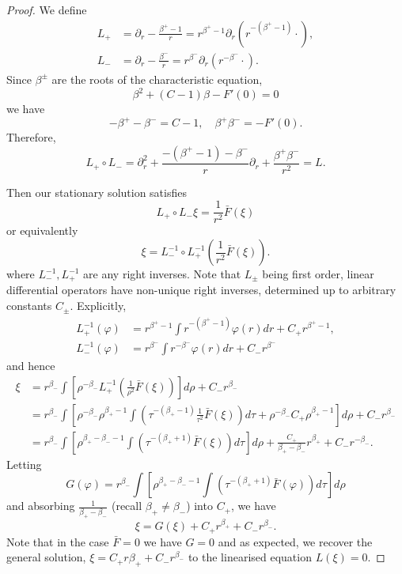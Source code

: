 \documentclass{amsart}
\begin{document}
\begin{proof}
We define
\begin{align*}
L_+ &= \partial_r - \frac{\beta^+ - 1}{r} = r^{\beta^+ - 1} \partial_r (r^{-(\beta^+ - 1)} \cdot) , \\
L_- &= \partial_r - \frac{\beta^-}{r} = r^{\beta^-} \partial_r (r^{-\beta^-} \cdot).
\end{align*}
Since \(\beta^{\pm}\) are the roots of the characteristic equation,
\[
\beta^2 + (C - 1) \beta - F'(0) = 0
\]
we have
\[
- \beta^+ - \beta^- = C-1, \quad \beta^+ \beta^- = -F'(0).
\]
Therefore,
\[
L_+ \circ L_- = \partial_r^2 + \frac{-(\beta^+ - 1) -\beta^-}{r} {\partial_r} + \frac{\beta^+ \beta^-}{r^2} = L.
\]

Then our stationary solution satisfies
\[
L_+ \circ L_- \xi = \frac{1}{r^2} \bar{F}(\xi)
\]
or equivalently
\[
\xi = L_-^{-1} \circ L_+^{-1} \left(\frac{1}{r^2} \bar{F}(\xi)\right).
\]
where \(L_-^{-1}, L_+^{-1}\) are any right inverses. Note that \(L_{\pm}\) being first order, linear differential operators have non-unique right inverses, determined up to arbitrary constants \(C_{\pm}\). Explicitly,
\begin{align*}
L_+^{-1} (\varphi) &= r^{\beta^+ - 1} \int r^{-(\beta^+ - 1)} \varphi(r) dr + C_+ r^{\beta^+-1}, \\
L_-^{-1} (\varphi) &= r^{\beta^-} \int r^{-\beta^-} \varphi(r) dr + C_- r^{\beta^-}
\end{align*}
and hence
\[
\begin{split}
\xi &= r^{\beta_-} \int \left[\rho^{-\beta_-} L_+^{-1} \left(\frac{1}{\rho^2} \bar{F}(\xi)\right)\right] d\rho + C_- r^{\beta_-} \\
&= r^{\beta_-} \int \left[\rho^{-\beta_-} \rho^{\beta_+ - 1} \int \left(\tau^{-(\beta_+ - 1)} \frac{1}{\tau^2} \bar{F}(\xi) \right)d\tau + \rho^{-\beta_-} C_+ \rho^{\beta_+-1}\right] d\rho + C_- r^{\beta_-} \\
&= r^{\beta_-} \int \left[\rho^{\beta_+ - \beta_- - 1} \int \left(\tau^{-(\beta_+ + 1)} \bar{F}(\xi) \right)d\tau\right] d\rho + \frac{C_+}{\beta_+ - \beta_-} r^{\beta_+} + C_- r^{-\beta_-}.
\end{split}
\]
Letting
\begin{equation}
\label{eq:stationaryC_G}
G(\varphi) = r^{\beta_-} \int \left[\rho^{\beta_+ - \beta_- - 1} \int \left(\tau^{-(\beta_+ + 1)} \bar{F}(\varphi) \right)d\tau\right] d\rho
\end{equation}
and absorbing \(\tfrac{1}{\beta_+ - \beta_-}\) (recall \(\beta_+ \ne \beta_-\)) into \(C_+\), we have
\[
\xi = G(\xi) + C_+ r^{\beta_+} + C_- r^{\beta_-}.
\]
Note that in the case \(\bar{F} = 0\) we have \(G = 0\) and as expected, we recover the general solution, \(\xi = C_+ r{\beta_+} + C_- r^{\beta_-}\) to the linearised equation \(L(\xi) = 0\).


\end{proof}
\end{document}
